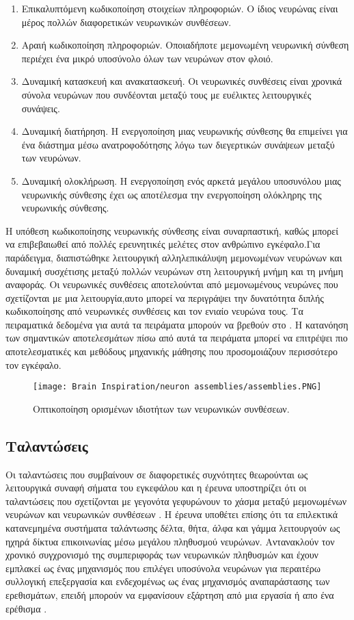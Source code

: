\documentclass[12pt]{report}
\begin{document}
\begin{enumerate}
    \item Επικαλυπτόμενη κωδικοποίηση στοιχείων πληροφοριών. Ο ίδιος νευρώνας είναι μέρος πολλών διαφορετικών νευρωνικών συνθέσεων. 
    \item Αραιή κωδικοποίηση πληροφοριών. Οποιαδήποτε μεμονωμένη νευρωνική σύνθεση περιέχει ένα μικρό υποσύνολο όλων των νευρώνων στον φλοιό.  
    \item Δυναμική κατασκευή και ανακατασκευή. Οι νευρωνικές συνθέσεις είναι χρονικά σύνολα νευρώνων που συνδέονται μεταξύ τους με ευέλικτες λειτουργικές συνάψεις.
    \item Δυναμική διατήρηση. Η ενεργοποίηση μιας νευρωνικής σύνθεσης θα επιμείνει για ένα διάστημα μέσω ανατροφοδότησης λόγω των διεγερτικών συνάψεων μεταξύ των νευρώνων.
    \item Δυναμική ολοκλήρωση. Η ενεργοποίηση ενός αρκετά μεγάλου υποσυνόλου μιας νευρωνικής σύνθεσης έχει ως αποτέλεσμα την ενεργοποίηση ολόκληρης της νευρωνικής σύνθεσης.
\end{enumerate}
Η υπόθεση κωδικοποίησης νευρωνικής σύνθεσης είναι συναρπαστική, καθώς μπορεί να επιβεβαιωθεί από πολλές ερευνητικές μελέτες στον ανθρώπινο εγκέφαλο.Για παράδειγμα, διαπιστώθηκε λειτουργική αλληλεπικάλυψη μεμονωμένων νευρώνων και δυναμική συσχέτισης μεταξύ πολλών νευρώνων στη λειτουργική μνήμη και τη μνήμη αναφοράς.
Οι νευρωνικές συνθέσεις αποτελούνται από μεμονωμένους νευρώνες που σχετίζονται με μια λειτουργία,αυτο μπορεί να περιγράψει την δυνατότητα διπλής κωδικοποίησης από νευρωνικές συνθέσεις και τον ενιαίο νευρώνα τους. Τα πειραματικά δεδομένα για αυτά τα πειράματα μπορούν να βρεθούν στο \cite{sakurai1999}. Η κατανόηση των σημαντικών αποτελεσμάτων πίσω από αυτά τα πειράματα μπορεί να επιτρέψει πιο αποτελεσματικές και μεθόδους μηχανικής μάθησης που προσομοιάζουν περισσότερο τον εγκέφαλο.
\begin{figure}[htp]
    \texttt{[image: Brain Inspiration/neuron assemblies/assemblies.PNG]}
    \caption{Οπτικοποίηση ορισμένων ιδιοτήτων των νευρωνικών συνθέσεων.}
    \label{fig:assemblies}
\end{figure}
\subsection{Ταλαντώσεις}
Οι ταλαντώσεις που συμβαίνουν σε διαφορετικές συχνότητες θεωρούνται ως λειτουργικά συναφή σήματα του εγκεφάλου και η έρευνα υποστηρίζει ότι οι ταλαντώσεις που σχετίζονται με γεγονότα γεφυρώνουν το χάσμα μεταξύ μεμονωμένων νευρώνων και νευρωνικών συνθέσεων \cite{Basar2000}. Η έρευνα υποθέτει επίσης ότι τα επιλεκτικά κατανεμημένα συστήματα ταλάντωσης δέλτα, θήτα, άλφα και γάμμα λειτουργούν ως ηχηρά δίκτυα επικοινωνίας μέσω μεγάλου πληθυσμού νευρώνων. Αντανακλούν τον χρονικό συγχρονισμό της συμπεριφοράς των νευρωνικών πληθυσμών και έχουν εμπλακεί ως ένας μηχανισμός που επιλέγει υποσύνολα νευρώνων για περαιτέρω συλλογική επεξεργασία και ενδεχομένως ως ένας μηχανισμός αναπαράστασης των ερεθισμάτων, επειδή μπορούν να εμφανίσουν εξάρτηση από μια εργασία ή απο ένα ερέθισμα \cite{Singer1995} \cite{Singer1999}.
\end{document}
